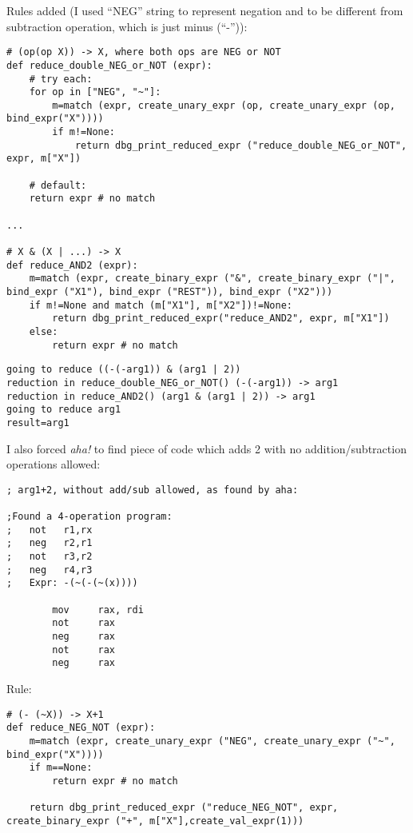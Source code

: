 ﻿\documentclass[12pt]{article}
\begin{document}
Rules added (I used ``NEG'' string to represent negation and to be different from subtraction operation,
which is just minus (``-'')):

\label{AND2}
\begin{lstlisting}
# (op(op X)) -> X, where both ops are NEG or NOT
def reduce_double_NEG_or_NOT (expr):
    # try each:
    for op in ["NEG", "~"]:
        m=match (expr, create_unary_expr (op, create_unary_expr (op, bind_expr("X"))))
        if m!=None:
            return dbg_print_reduced_expr ("reduce_double_NEG_or_NOT", expr, m["X"])

    # default:
    return expr # no match

...

# X & (X | ...) -> X
def reduce_AND2 (expr):
    m=match (expr, create_binary_expr ("&", create_binary_expr ("|", bind_expr ("X1"), bind_expr ("REST")), bind_expr ("X2")))
    if m!=None and match (m["X1"], m["X2"])!=None:
        return dbg_print_reduced_expr("reduce_AND2", expr, m["X1"])
    else:
        return expr # no match
\end{lstlisting}

\begin{lstlisting}
going to reduce ((-(-arg1)) & (arg1 | 2))
reduction in reduce_double_NEG_or_NOT() (-(-arg1)) -> arg1
reduction in reduce_AND2() (arg1 & (arg1 | 2)) -> arg1
going to reduce arg1
result=arg1
\end{lstlisting}

I also forced \textit{aha!} to find piece of code which adds 2 with no addition/subtraction operations allowed:

\begin{lstlisting}
; arg1+2, without add/sub allowed, as found by aha:

;Found a 4-operation program:
;   not   r1,rx
;   neg   r2,r1
;   not   r3,r2
;   neg   r4,r3
;   Expr: -(~(-(~(x))))

        mov     rax, rdi
        not     rax
        neg     rax
        not     rax
        neg     rax
\end{lstlisting}

Rule:

\begin{lstlisting}
# (- (~X)) -> X+1
def reduce_NEG_NOT (expr):
    m=match (expr, create_unary_expr ("NEG", create_unary_expr ("~", bind_expr("X"))))
    if m==None:
        return expr # no match
    
    return dbg_print_reduced_expr ("reduce_NEG_NOT", expr, create_binary_expr ("+", m["X"],create_val_expr(1)))
\end{lstlisting}
\end{document}
